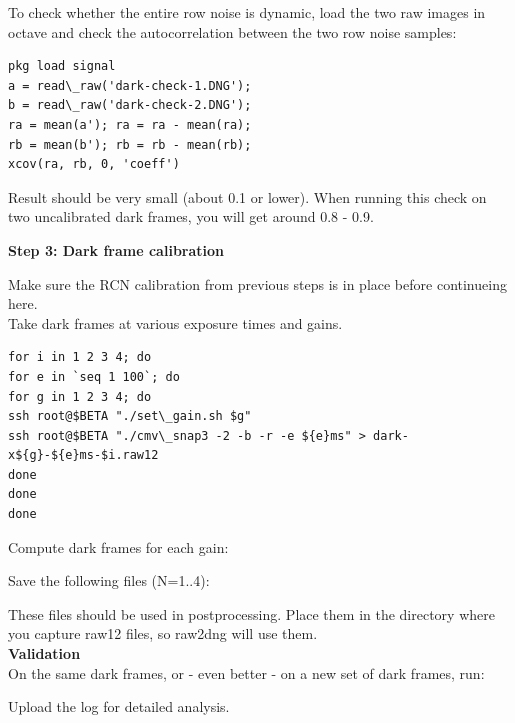 To check whether the entire row noise is dynamic, load the two raw images in octave and check the autocorrelation between the two row noise samples: 

\begin{lstlisting}[breaklines=true, breakatwhitespace=true]
pkg load signal
a = read\_raw('dark-check-1.DNG');
b = read\_raw('dark-check-2.DNG');
ra = mean(a'); ra = ra - mean(ra);
rb = mean(b'); rb = rb - mean(rb);
xcov(ra, rb, 0, 'coeff')
\end{lstlisting} 

Result should be very small (about 0.1 or lower). When running this check on two uncalibrated dark frames, you will get around 0.8 - 0.9.

\textbf{Step 3: Dark frame calibration}

Make sure the RCN calibration from previous steps is in place before continueing here.\\

Take dark frames at various exposure times and gains.

\begin{lstlisting}[breaklines=true, breakatwhitespace=true]
for i in 1 2 3 4; do
for e in `seq 1 100`; do
for g in 1 2 3 4; do
ssh root@$BETA "./set\_gain.sh $g"
ssh root@$BETA "./cmv\_snap3 -2 -b -r -e ${e}ms" > dark-x${g}-${e}ms-$i.raw12
done
done
done
\end{lstlisting} 

Compute dark frames for each gain: 


Save the following files (N=1..4): 
	

These files should be used in postprocessing. Place them in the directory where you capture raw12 files, so raw2dng will use them.\\

\textbf{Validation}\\ 

On the same dark frames, or - even better - on a new set of dark frames, run: 


Upload the log for detailed analysis.\\

